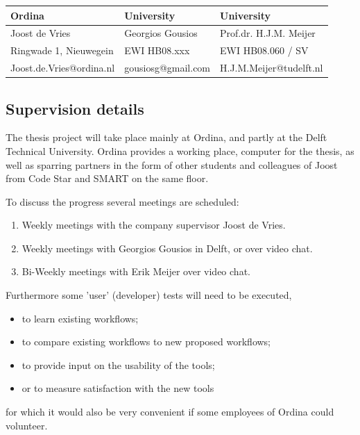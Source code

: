 \documentclass[11pt,a4paper]{article}
\begin{document}
\begin{table}[h]
    \centering
    \begin{tabular}{@{}lll@{}}
        \textbf{Ordina}                 & \textbf{University}     & \textbf{University}     \\ 
        \hline
        Joost de Vries                  & Georgios Gousios        & Prof.dr. H.J.M. Meijer  \\ 
        Ringwade 1, Nieuwegein          & EWI HB08.xxx            & EWI HB08.060 / SV       \\ %
         
        Joost.de.Vries@ordina.nl        & gousiosg@gmail.com      & H.J.M.Meijer@tudelft.nl \\ 
    \end{tabular}
\end{table}

\subsection{Supervision details} The thesis project will take place
mainly at Ordina, and partly at the Delft Technical University.  Ordina
provides a working place, computer for the thesis, as well as sparring
partners in the form of other students and colleagues of Joost from Code
Star and SMART on the same floor.

\noindent
To discuss the progress several meetings are scheduled:
\begin{enumerate}
    \item
        Weekly meetings with the company supervisor Joost de Vries.
    \item
        Weekly meetings with Georgios Gousios in Delft, or over video
        chat.
    \item
        Bi-Weekly meetings with Erik Meijer over video chat.
\end{enumerate}

\noindent
Furthermore some 'user' (developer) tests will need to be executed,
\begin{itemize}
    \item
        to learn existing workflows;
    \item
        to compare existing workflows to new proposed workflows;
    \item
        to provide input on the usability of the tools;
    \item
        or to measure satisfaction with the new tools
\end{itemize}
for which it would also be very convenient if some employees of Ordina
could volunteer.
\end{document}
